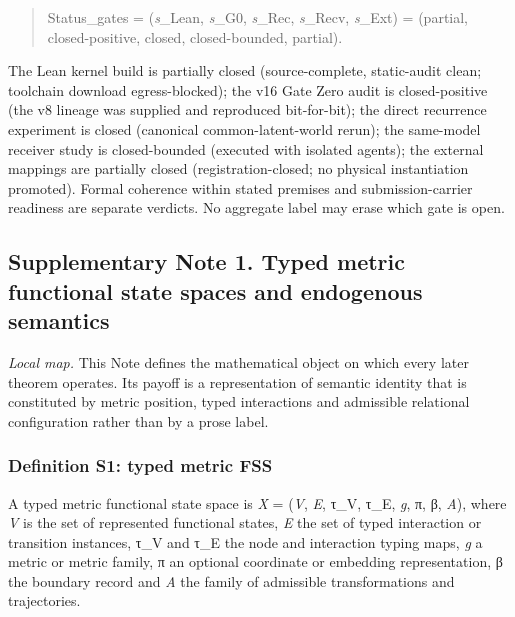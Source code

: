 \begin{quote}
Status\_gates = (\emph{s}\_Lean, \emph{s}\_G0, \emph{s}\_Rec,
\emph{s}\_Recv, \emph{s}\_Ext) = (partial, closed-positive, closed,
closed-bounded, partial).
\end{quote}

The Lean kernel build is partially closed (source-complete, static-audit
clean; toolchain download egress-blocked); the v16 Gate Zero audit is
closed-positive (the v8 lineage was supplied and reproduced
bit-for-bit); the direct recurrence experiment is closed (canonical
common-latent-world rerun); the same-model receiver study is
closed-bounded (executed with isolated agents); the external mappings
are partially closed (registration-closed; no physical instantiation
promoted). Formal coherence within stated premises and
submission-carrier readiness are separate verdicts. No aggregate label
may erase which gate is open.

\hypertarget{supplementary-note-1.-typed-metric-functional-state-spaces-and-endogenous-semantics}{%
\subsection{Supplementary Note 1. Typed metric functional state spaces
and endogenous
semantics}\label{supplementary-note-1.-typed-metric-functional-state-spaces-and-endogenous-semantics}}

\emph{Local map.} This Note defines the mathematical object on which
every later theorem operates. Its payoff is a representation of semantic
identity that is constituted by metric position, typed interactions and
admissible relational configuration rather than by a prose label.

\hypertarget{definition-s1-typed-metric-fss}{%
\subsubsection{Definition S1: typed metric
FSS}\label{definition-s1-typed-metric-fss}}

A typed metric functional state space is \emph{X} = (\emph{V}, \emph{E},
τ\_V, τ\_E, \emph{g}, π, β, \emph{A}), where \emph{V} is the set of
represented functional states, \emph{E} the set of typed interaction or
transition instances, τ\_V and τ\_E the node and interaction typing
maps, \emph{g} a metric or metric family, π an optional coordinate or
embedding representation, β the boundary record and \emph{A} the family
of admissible transformations and trajectories.

